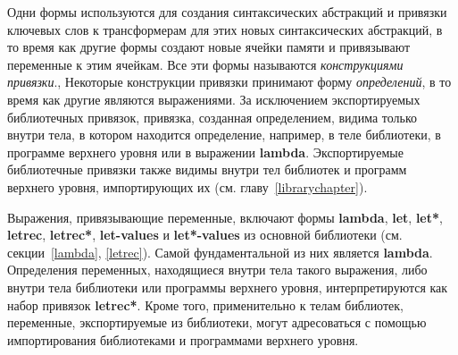 Одни формы используются для создания синтаксических абстракций и привязки ключевых
слов к трансформерам для этих новых синтаксических абстракций, в то время как другие формы
создают новые ячейки памяти и привязывают переменные к этим ячейкам. Все эти
формы называются {\em конструкциями привязки}., Некоторые
конструкции привязки принимают форму \textit{определений}, в то время как
другие являются выражениями. За исключением экспортируемых библиотечных привязок, привязка,
созданная определением, видима только внутри тела, в котором находится определение,
например, в теле библиотеки, в программе верхнего уровня или в выражении {\cf\bfseries
  lambda}. Экспортируемые библиотечные привязки также видимы внутри тел библиотек и программ
верхнего уровня, импортирующих их (см. главу~\ref{librarychapter}).

Выражения, привязывающие переменные, включают формы {\cf\bfseries lambda}, {\cf\bfseries let},
{\cf\bfseries let*}, {\cf\bfseries letrec}, {\cf\bfseries letrec*}, {\cf\bfseries let-values} и
{\cf\bfseries let*-values} из основной библиотеки (см. секции~\ref{lambda}, \ref{letrec}). Самой
фундаментальной из них является {\cf\bfseries lambda}. Определения переменных, находящиеся
внутри тела такого выражения, либо внутри тела библиотеки или программы верхнего уровня,
интерпретируются как набор привязок {\cf\bfseries letrec*}. Кроме того, применительно к телам
библиотек, переменные, экспортируемые из библиотеки, могут адресоваться с помощью импортирования
библиотеками и программами верхнего уровня.

